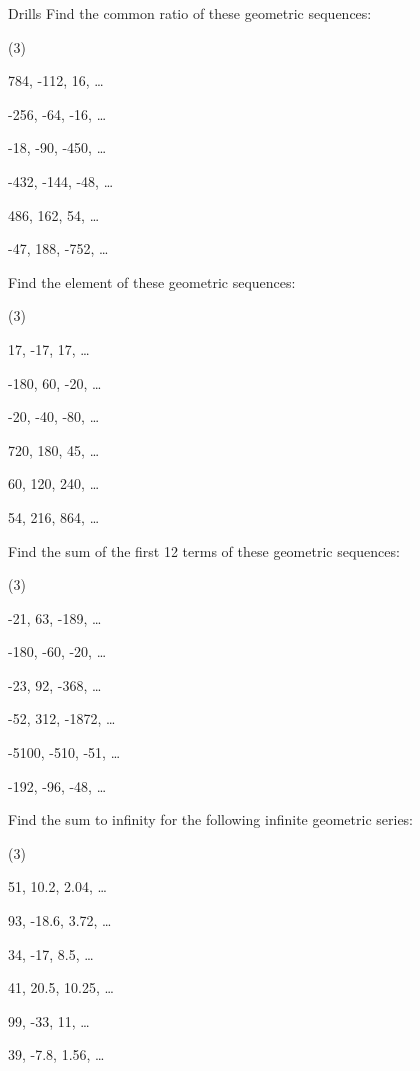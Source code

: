 \documentclass[../../main.tex]{subfiles}
\begin{document}
\begin{questions}{Drills}
Find the common ratio of these geometric sequences:
\begin{question_set}(3)
    \item 784, -112, 16, \ldots
    \item -256, -64, -16, \ldots
    \item -18, -90, -450, \ldots
    \item -432, -144, -48, \ldots
    \item 486, 162, 54, \ldots
    \item -47, 188, -752, \ldots
\end{question_set}

Find the  element of these geometric sequences:
\begin{question_set}(3)
    \item 17, -17, 17, \ldots
    \item -180, 60, -20, \ldots
    \item -20, -40, -80, \ldots
    \item 720, 180, 45, \ldots
    \item 60, 120, 240, \ldots
    \item 54, 216, 864, \ldots
\end{question_set}

Find the sum of the first 12 terms of these geometric sequences:
\begin{question_set}(3)
    \item -21, 63, -189, \ldots
    \item -180, -60, -20, \ldots
    \item -23, 92, -368, \ldots
    \item -52, 312, -1872, \ldots
    \item -5100, -510, -51, \ldots
    \item -192, -96, -48, \ldots
\end{question_set}

Find the sum to infinity for the following infinite geometric series:
\begin{question_set}(3)
    \item 51, 10.2, 2.04, \ldots
    \item 93, -18.6, 3.72, \ldots
    \item 34, -17, 8.5, \ldots
    \item 41, 20.5, 10.25, \ldots
    \item 99, -33, 11, \ldots
    \item 39, -7.8, 1.56, \ldots
\end{question_set}
\end{questions}
\end{document}
